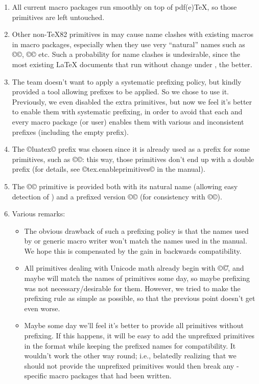 \documentclass{lltxdoc}
\begin{document}
{\begin{myquote}
  \begin{enumerate}
    \item All current macro packages run smoothly on top of pdf(e)TeX, so
      those primitives are left untouched.
    \item Other non-TeX82 primitives in \luatex may cause name clashes with
      existing macros in macro packages, especially when they use very
      ``natural'' names such as ©\outputbox©, ©\mathstyle© etc. Such a
      probability for name clashes is undesirable, since the most existing
      LaTeX documents that run without change under \luatex, the better.
    \item The \luatex team doesn't want to apply a systematic prefixing policy,
      but kindly provided a tool allowing prefixes to be applied. So we chose
      to use it.  Previously, we even disabled the extra primitives, but now
      we feel it's better to enable them with systematic prefixing, in order
      to avoid that each and every macro package (or user) enables them with
      various and inconsistent prefixes (including the empty prefix).
    \item The ©luatex© prefix was chosen since it is already used as a prefix
      for some primitives, such as ©\luatexversion©: this way, those
      primitives don't end up with a double prefix (for details, see
      ©tex.enableprimitives© in the \luatex manual).
    \item The ©\directlua© primitive is provided both with its natural name
      (allowing easy detection of \luatex) and a prefixed version
      ©\luatexdirectlua© (for consistency with ©\luatexlatelua©).
    \item Various remarks:
      \begin{itemize}
        \item The obvious drawback of such a prefixing policy is that the
          names used by \latex or generic macro writer won't match the names
          used in the manual.  We hope this is compensated by the gain in
          backwards compatibility.
        \item All primitives dealing with Unicode math already begin with ©\U©,
          and maybe will match the names of \xetex primitives some day, so
          maybe prefixing was not necessary/desirable for them. However, we
          tried to make the prefixing rule as simple as possible, so that
          the previous point doesn't get even worse.
        \item Maybe some day we'll feel it's better to provide all primitives
          without prefixing. If this happens, it will be easy to add the
          unprefixed primitives in the format while keeping the prefixed names
          for compatibility. It wouldn't work the other way round; i.e.,
          belatedly realizing that we should not provide the unprefixed
          primitives would then break any \luatex-specific macro packages
          that had been written.
      \end{itemize}
  \end{enumerate}
\end{myquote}

}
\end{document}
